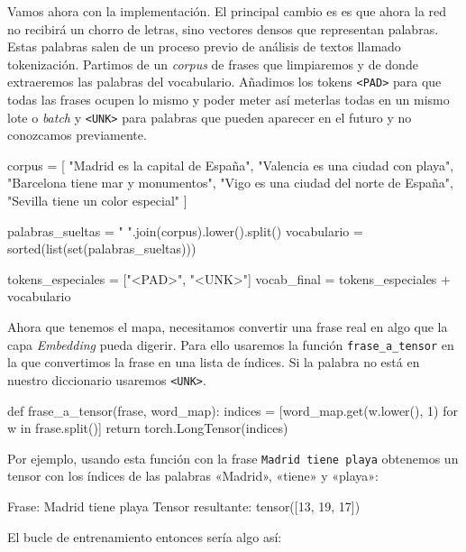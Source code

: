 \documentclass[a4paper,11pt]{article}
\begin{document}
Vamos ahora con la implementación. El principal cambio es es que ahora la red no
recibirá un chorro de letras, sino vectores densos que representan
palabras. Estas palabras salen de un proceso previo de análisis de textos
llamado tokenización. Partimos de un \emph{corpus} de frases que limpiaremos y
de donde extraeremos las palabras del vocabulario. Añadimos los tokens
\texttt{\textless{}PAD\textgreater{}} para que todas las frases ocupen lo mismo
y poder meter así meterlas todas en un mismo lote o \emph{batch} y
\texttt{\textless{}UNK\textgreater{}} para palabras que pueden aparecer en el
futuro y no conozcamos previamente.

\begin{codigo}
corpus = [
    "Madrid es la capital de España",
    "Valencia es una ciudad con playa",
    "Barcelona tiene mar y monumentos",
    "Vigo es una ciudad del norte de España",
    "Sevilla tiene un color especial"
]


palabras_sueltas = " ".join(corpus).lower().split()
vocabulario = sorted(list(set(palabras_sueltas)))

tokens_especiales = ["<PAD>", "<UNK>"]
vocab_final = tokens_especiales + vocabulario
\end{codigo}

Ahora que tenemos el mapa, necesitamos convertir una frase real en algo
que la capa \emph{Embedding} pueda digerir. Para ello usaremos la
función \texttt{frase\_a\_tensor} en la que convertimos la frase en una
lista de índices. Si la palabra no está en nuestro diccionario usaremos
\texttt{\textless{}UNK\textgreater{}}.

\begin{codigo}
def frase_a_tensor(frase, word_map):
    indices = [word_map.get(w.lower(), 1) for w in frase.split()]
    return torch.LongTensor(indices)
\end{codigo}

Por ejemplo, usando esta función con la frase
\texttt{Madrid\ tiene\ playa} obtenemos un tensor con los índices de las
palabras «Madrid», «tiene» y «playa»:

\begin{codigo}
Frase: Madrid tiene playa
Tensor resultante: tensor([13, 19, 17])
\end{codigo}

El bucle de entrenamiento entonces sería algo así:
\end{document}
